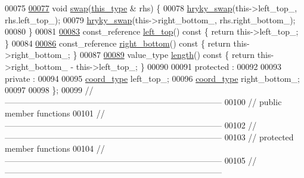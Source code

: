 \begin{DoxyCode}
00075 
\hypertarget{geometry__rect_8h_source_l00077}{}\hyperlink{classhryky_1_1geometry_1_1_rect_a0d7220afb7ed9c0cd1f5d2575205e027}{00077}     \textcolor{keywordtype}{void} \hyperlink{classhryky_1_1geometry_1_1_rect_a0d7220afb7ed9c0cd1f5d2575205e027}{swap}(\hyperlink{classhryky_1_1geometry_1_1_rect}{this_type} & rhs) \{
00078         \hyperlink{namespacehryky_add9c1c1fdfda07cd47bcb7c16d3a823a}{hryky_swap}(this->left\_top\_, rhs.left\_top\_);
00079         \hyperlink{namespacehryky_add9c1c1fdfda07cd47bcb7c16d3a823a}{hryky_swap}(this->right\_bottom\_, rhs.right\_bottom\_);
00080     \}
00081 
\hypertarget{geometry__rect_8h_source_l00083}{}\hyperlink{classhryky_1_1geometry_1_1_rect_aad79f890789ec023b8493f263066d8e4}{00083}     const\_reference \hyperlink{classhryky_1_1geometry_1_1_rect_aad79f890789ec023b8493f263066d8e4}{left_top}()\textcolor{keyword}{ const }\{ \textcolor{keywordflow}{return} this->left\_top\_; \}
00084 
\hypertarget{geometry__rect_8h_source_l00086}{}\hyperlink{classhryky_1_1geometry_1_1_rect_a28bb3b1a495b06aad499d7a5384b1a9c}{00086}     const\_reference \hyperlink{classhryky_1_1geometry_1_1_rect_a28bb3b1a495b06aad499d7a5384b1a9c}{right_bottom}()\textcolor{keyword}{ const }\{ \textcolor{keywordflow}{return} this->right\_bottom\_; \}
00087 
\hypertarget{geometry__rect_8h_source_l00089}{}\hyperlink{classhryky_1_1geometry_1_1_rect_a92d8a437f4d54cd3c4d6f1dce403471b}{00089}     value\_type \hyperlink{classhryky_1_1geometry_1_1_rect_a92d8a437f4d54cd3c4d6f1dce403471b}{length}()\textcolor{keyword}{ const }\{ \textcolor{keywordflow}{return} this->right\_bottom\_ - this->left\_top\_; \}
00090 
00091 \textcolor{keyword}{protected} :
00092 
00093 \textcolor{keyword}{private} :
00094 
00095     \hyperlink{classhryky_1_1geometry_1_1_rect_a29254f5688740dd2a2085bae93a14124}{coord_type}      left\_top\_;
00096     \hyperlink{classhryky_1_1geometry_1_1_rect_a29254f5688740dd2a2085bae93a14124}{coord_type}      right\_bottom\_;
00097 
00098 \};
00099 \textcolor{comment}{//
      ------------------------------------------------------------------------------}
00100 \textcolor{comment}{// public member functions}
00101 \textcolor{comment}{//
      ------------------------------------------------------------------------------}
00102 \textcolor{comment}{//
      ------------------------------------------------------------------------------}
00103 \textcolor{comment}{// protected member functions}
00104 \textcolor{comment}{//
      ------------------------------------------------------------------------------}
00105 \textcolor{comment}{//
      ------------------------------------------------------------------------------}

\end{DoxyCode}
